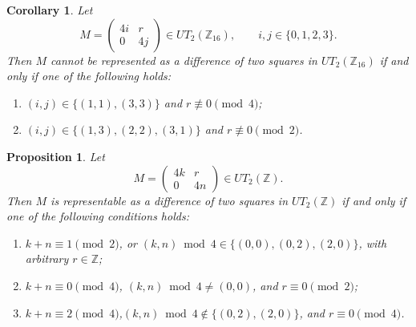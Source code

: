 \documentclass[10pt,a4paper]{amsart}
\newtheorem{corollary}{Corollary}
\newtheorem{proposition}{Proposition}
\def\Z{\mathbb{Z}}
\begin{document}
\begin{corollary}\label{cor:nonrep-mod16}
Let
\[
M=\begin{pmatrix}4i&r\\0&4j\end{pmatrix}\in UT_2(\mathbb Z_{16}),
\qquad i,j\in\{0,1,2,3\}.
\]
Then $M$ cannot be represented as a difference of two squares in $UT_2(\mathbb Z_{16})$ if and only if one of the following holds:
\begin{enumerate}
\item$(i,j)\in\{(1,1),(3,3)\}$ and $r\not\equiv 0\pmod 4$;
\item$(i,j)\in\{(1,3),(2,2),(3,1)\}$ and $r\not\equiv 0\pmod 2$.
\end{enumerate}
\end{corollary}

\begin{proposition}\label{prop:4k-4n-complete}
Let
$$M=\begin{pmatrix}4k&r\\0&4n\end{pmatrix}\in UT_2(\Z).$$
Then $M$ is representable as a difference of two squares in $UT_2(\Z)$ if and only if one of the following conditions holds:
\begin{enumerate}
\item $k+n\equiv1\pmod 2$, or $(k,n)\bmod 4\in\{(0,0),(0,2),(2,0)\}$, with arbitrary $r\in\mathbb Z$;
\item $k+n\equiv0\pmod 4$, $(k,n)\bmod 4\neq(0,0)$, and $r\equiv0\pmod 2$;
\item $k+n\equiv2\pmod 4$,$(k,n)\bmod 4\notin\{(0,2),(2,0)\}$, and $r\equiv0\pmod 4$.
\end{enumerate}
\end{proposition}
\end{document}
